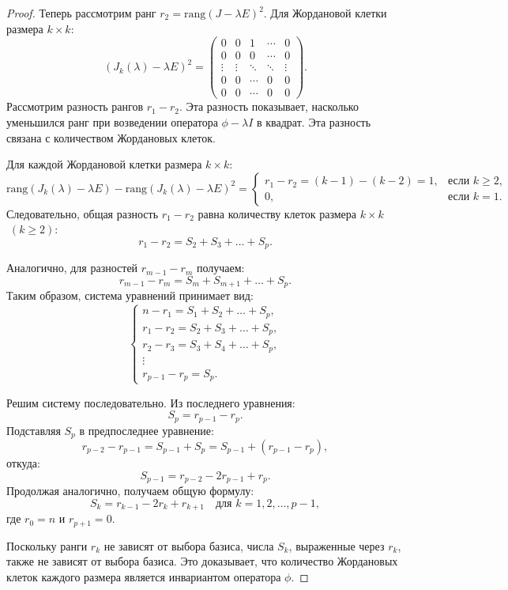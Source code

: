 \begin{proof}
    
    Теперь рассмотрим ранг \( r_2 = \text{rang}(J - \lambda E)^2 \). Для Жордановой клетки размера \( k \times k \):
    \[
    (J_k(\lambda) - \lambda E)^2 = \begin{pmatrix}
    0 & 0 & 1 & \cdots & 0 \\
    0 & 0 & 0 & \cdots & 0 \\
    \vdots & \vdots & \ddots & \ddots & \vdots \\
    0 & 0 & \cdots & 0 & 0 \\
    0 & 0 & \cdots & 0 & 0
    \end{pmatrix}.
    \]
    Рассмотрим разность рангов \( r_1 - r_2 \). Эта разность показывает, насколько \\уменьшился ранг при возведении оператора \( \phi - \lambda I \) в квадрат. Эта разность связана с количеством Жордановых клеток. 
    
    Для каждой Жордановой клетки размера \( k \times k \):
    \[
    \text{rang}(J_k(\lambda) - \lambda E) - \text{rang}(J_k(\lambda) - \lambda E)^2 = 
    \begin{cases}
        r_{1} - r_{2} = (k - 1) - (k - 2) = 1, & \text{если } k \geq 2, \\
        0, & \text{если } k = 1.
    \end{cases}
    \]
    Следовательно, общая разность \( r_1 - r_2 \) равна количеству клеток размера \( k \times k \) \(\; (k \geq 2)\):
    \[
    r_1 - r_2 = S_2 + S_3 + \ldots + S_p.
    \]

    
    Аналогично, для разностей \( r_{m-1} - r_m \) получаем:
    \[
    r_{m-1} - r_m = S_m + S_{m+1} + \ldots + S_p.
    \]
    Таким образом, система уравнений принимает вид:
    \[
    \begin{cases}
        n - r_1 = S_1 + S_2 + \ldots + S_p, \\
        r_1 - r_2 = S_2 + S_3 + \ldots + S_p, \\
        r_2 - r_3 = S_3 + S_4 + \ldots + S_p, \\
        \vdots \\
        r_{p-1} - r_p = S_p.
    \end{cases}
    \]

    Решим систему последовательно. Из последнего уравнения:
    \[
    S_p = r_{p-1} - r_p.
    \]
    Подставляя \( S_p \) в предпоследнее уравнение:
    \[
    r_{p-2} - r_{p-1} = S_{p-1} + S_p = S_{p-1} + (r_{p-1} - r_p),
    \]
    откуда:
    \[
    S_{p-1} = r_{p-2} - 2r_{p-1} + r_p.
    \]
    Продолжая аналогично, получаем общую формулу:
    \[
    S_k = r_{k-1} - 2r_k + r_{k+1} \quad \text{для } k = 1, 2, \ldots, p-1,
    \]
    где \( r_0 = n \) и \( r_{p+1} = 0 \).

    
    Поскольку ранги \( r_k \) не зависят от выбора базиса, числа \( S_k \), выраженные через \( r_k \), также не зависят от выбора базиса. Это доказывает, что количество Жордановых клеток каждого размера является инвариантом оператора \( \phi \).
\end{proof}

